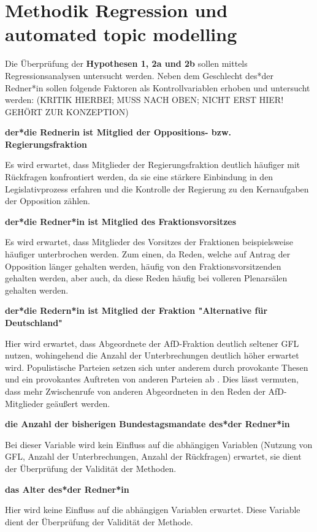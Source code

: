 \documentclass[12pt, 
    twoside=false, 
    bibliography=totoc, 
    numbers=endperiod, 
    headings=normal, 
    toc=chapterentrydotfill
    ]{scrbook}
\begin{document}
\section{Methodik Regression und automated topic modelling}


Die Überprüfung der \textbf{Hypothesen 1, 2a und 2b} sollen mittels Regressionsanalysen untersucht werden. Neben dem Geschlecht des*der Redner*in sollen folgende Faktoren als Kontrollvariablen erhoben und untersucht werden: (KRITIK HIERBEI; MUSS NACH OBEN; NICHT ERST HIER! GEHÖRT ZUR KONZEPTION)

\textbf{der*die Rednerin ist Mitglied der Oppositions- bzw. Regierungsfraktion}

Es wird erwartet, dass Mitglieder der Regierungsfraktion deutlich häufiger mit Rückfragen konfrontiert werden, da sie eine stärkere Einbindung in den Legislativprozess erfahren und die Kontrolle der Regierung zu den Kernaufgaben der Opposition zählen.

\textbf{der*die Redner*in ist Mitglied des Fraktionsvorsitzes}

Es wird erwartet, dass Mitglieder des Vorsitzes der Fraktionen beispielsweise häufiger unterbrochen werden. Zum einen, da Reden, welche auf Antrag der Opposition länger gehalten werden, häufig von den Fraktionsvorsitzenden gehalten werden, aber auch, da diese Reden häufig bei volleren Plenarsälen gehalten werden.

\textbf{der*die Redern*in ist Mitglied der Fraktion "Alternative für Deutschland"}

Hier wird erwartet, dass Abgeordnete der AfD-Fraktion deutlich seltener GFL nutzen, wohingehend die Anzahl der Unterbrechungen deutlich höher erwartet wird. Populistische Parteien setzen sich unter anderem durch provokante Thesen und ein provokantes Auftreten von anderen Parteien ab \parencites[vgl.][]{decker_populismus_2006}{priester_2012}. Dies lässt vermuten, dass mehr Zwischenrufe von anderen Abgeordneten in den Reden der AfD-Mitglieder geäußert werden.

\textbf{die Anzahl der bisherigen Bundestagsmandate des*der Redner*in}

Bei dieser Variable wird kein Einfluss auf die abhängigen Variablen (Nutzung von GFL, Anzahl der Unterbrechungen, Anzahl der Rückfragen) erwartet, sie dient der Überprüfung der Validität der Methoden.

\textbf{das Alter des*der Redner*in}

Hier wird keine Einfluss auf die abhängigen Variablen erwartet. Diese Variable dient der Überprüfung der Validität der Methode.
\end{document}
